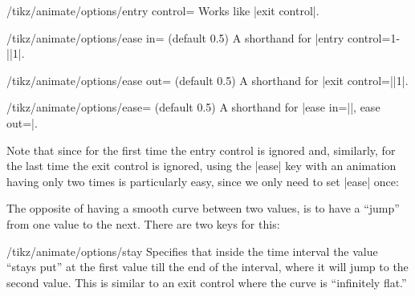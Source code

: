 \begin{key}{/tikz/animate/options/entry control=}
  Works like |exit control|.
\end{key}
  
\begin{key}{/tikz/animate/options/ease in= (default 0.5)}
  A shorthand for |entry control={1-||}{1}|.
\end{key}

\begin{key}{/tikz/animate/options/ease out= (default 0.5)}
  A shorthand for |exit control={||}{1}|.
\end{key}

\begin{key}{/tikz/animate/options/ease= (default 0.5)}
  A shorthand for |ease in=||, ease out=|.

  Note that since for the first time the entry control is ignored and,
  similarly, for the last time the exit control is ignored, using the
  |ease| key with an animation having only two times is particularly
  easy, since we only need to set |ease| once:

\begin{codeexample}[animation list={0.333/\frac{1}{3},0.666/\frac{2}{3},1,1.333/1\frac{1}{3},1.666/1\frac{2}{3}}]
\end{codeexample}
\end{key}


The opposite of having a smooth curve between two values, is to have
a ``jump'' from one value to the next. There are two keys for this:


\begin{key}{/tikz/animate/options/stay}
  Specifies that inside the time interval the value ``stays put'' at
  the first value till the end of the interval, where it will jump
  to the second value. This is similar to an exit control where the
  curve is ``infinitely flat.''
    
\begin{codeexample}[animation list={0.5,1,1.5,2,2.5}]
\end{codeexample}
\end{key}
  
